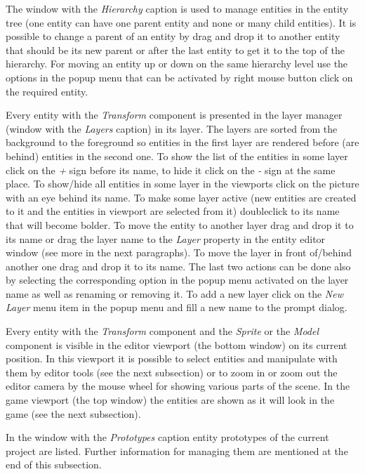 The window with the \emph{Hierarchy} caption is used to manage entities in the entity tree (one entity can have one parent entity and none or many child entities). It is possible to change a parent of an entity by drag and drop it to another entity that should be its new parent or after the last entity to get it to the top of the hierarchy. For moving an entity up or down on the same hierarchy level use the options in the popup menu that can be activated by right mouse button click on the required entity.

Every entity with the \emph{Transform} component is presented in the layer manager (window with the \emph{Layers} caption) in its layer. The layers are sorted from the background to the foreground so entities in the first layer are rendered before (are behind) entities in the second one. To show the list of the entities in some layer click on the \emph{+} sign before its name, to hide it click on the \emph{-} sign at the same place. To show/hide all entities in some layer in the viewports click on the picture with an eye behind its name. To make some layer active (new entities are created to it and the entities in viewport are selected from it) doubleclick to its name that will become bolder. To move the entity to another layer drag and drop it to its name or drag the layer name to the \emph{Layer} property in the entity editor window (see more in the next paragraphs). To move the layer in front of/behind another one drag and drop it to its name. The last two actions can be done also by selecting the corresponding option in the popup menu activated on the layer name as well as renaming or removing it. To add a new layer click on the \emph{New Layer} menu item in the popup menu and fill a new name to the prompt dialog.

Every entity with the \emph{Transform} component and the \emph{Sprite} or the \emph{Model} component is visible in the editor viewport (the bottom window) on its current position. In this viewport it is possible to select entities and manipulate with them by editor tools (see the next subsection) or to zoom in or zoom out the editor camera by the mouse wheel for showing various parts of the scene. In the game viewport (the top window) the entities are shown as it will look in the game (see the next subsection).

In the window with the \emph{Prototypes} caption entity prototypes of the current project are listed. Further information for managing them are mentioned at the end of this subsection.

